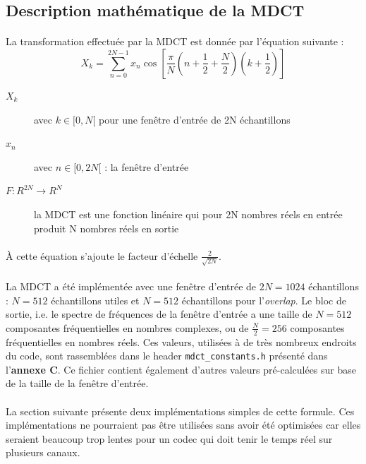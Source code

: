 \documentclass{article}
\begin{document}
    \subsection{Description mathématique de la MDCT}
    \label{sec:desc-math}

    \paragraph{}
    La transformation effectuée par la MDCT est donnée par l'équation suivante\cite{wiki:MDCT} :
    $$X_k = \sum_{n=0}^{2N-1} x_n \cos \left[ \frac{\pi}{N} \left( n + \frac{1}{2} + \frac{N}{2} \right) \left( k + \frac{1}{2} \right) \right]$$
    \begin{description}
        \item[$X_k$] avec $k \in [0, N[$ pour une fenêtre d'entrée de 2N échantillons
        \item[$x_n$] avec $n \in [0, 2N[$ : la fenêtre d'entrée
        \item[$F: R^{2N} \rightarrow R^N$] la MDCT est une fonction linéaire qui pour 2N nombres réels en entrée produit N nombres réels en sortie
    \end{description}\label{test}

    \paragraph{}
    À cette équation s'ajoute le facteur d'échelle $\frac{2}{\sqrt{2N}}$.

    \paragraph{}
    La MDCT a été implémentée avec une fenêtre d'entrée de $2N = 1024$ échantillons : $N = 512$ échantillons utiles et $N = 512$ échantillons pour l'\emph{overlap}. Le bloc de sortie, i.e. le spectre de fréquences de la fenêtre d'entrée a une taille de $N = 512$ composantes fréquentielles en nombres complexes, ou de $\frac{N}{2} = 256$ composantes fréquentielles en nombres réels. Ces valeurs, utilisées à de très nombreux endroits du code, sont rassemblées dans le header \texttt{mdct\_constants.h} présenté dans l'\textbf{annexe C}. Ce fichier contient également d'autres valeurs pré-calculées sur base de la taille de la fenêtre d'entrée.

    \paragraph{}
    La section suivante présente deux implémentations simples de cette formule. Ces implémentations ne pourraient pas être utilisées sans avoir été optimisées car elles seraient beaucoup trop lentes pour un codec qui doit tenir le temps réel sur plusieurs canaux.
\end{document}
